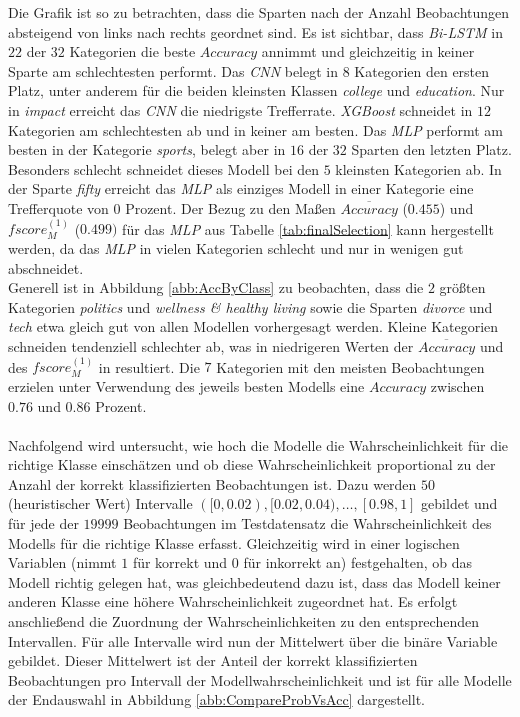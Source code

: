 \documentclass[a4paper,11pt]{article}
\begin{document}
Die Grafik ist so zu betrachten, dass die Sparten nach der Anzahl Beobachtungen absteigend von links nach rechts geordnet sind. Es ist sichtbar, dass \textit{Bi-LSTM} in $22$ der $32$ Kategorien die beste $Accuracy$ annimmt und gleichzeitig in keiner Sparte am schlechtesten performt. Das \textit{CNN} belegt in $8$ Kategorien den ersten Platz, unter anderem für die beiden kleinsten Klassen \textit{college} und \textit{education}. Nur in \textit{impact} erreicht das \textit{CNN} die niedrigste Trefferrate.
\textit{XGBoost} schneidet in $12$ Kategorien am schlechtesten ab und in keiner am besten. Das \textit{MLP} performt am besten in der Kategorie \textit{sports}, belegt aber in $16$ der $32$ Sparten den letzten Platz. Besonders schlecht schneidet dieses Modell bei den $5$ kleinsten Kategorien ab. In der Sparte \textit{fifty} erreicht das \textit{MLP} als einziges Modell in einer Kategorie eine Trefferquote von $0$ Prozent. Der Bezug zu den Maßen $\overline{Accuracy}$ ($0.455$) und $fscore_M^{(1)}$ ($0.499)$ für das \textit{MLP} aus Tabelle \ref{tab:finalSelection} kann hergestellt werden, da das \textit{MLP} in vielen Kategorien schlecht und nur in wenigen gut abschneidet. \\
Generell ist in Abbildung \ref{abb:AccByClass} zu beobachten, dass die $2$ größten Kategorien \textit{politics} und \textit{wellness \& healthy living} sowie die Sparten \textit{divorce} und \textit{tech} etwa gleich gut von allen Modellen vorhergesagt werden. Kleine Kategorien schneiden tendenziell schlechter ab, was in niedrigeren Werten der $\overline{Accuracy}$ und des $fscore_M^{(1)}$ in resultiert. Die $7$ Kategorien mit den meisten Beobachtungen erzielen unter Verwendung des jeweils besten Modells eine $Accuracy$ zwischen $0.76$ und $0.86$ Prozent. \\
\\
Nachfolgend wird untersucht, wie hoch die Modelle die Wahrscheinlichkeit für die richtige Klasse einschätzen und ob diese Wahrscheinlichkeit proportional zu der Anzahl der korrekt klassifizierten Beobachtungen ist. Dazu werden $50$ (heuristischer Wert) Intervalle $([0, 0.02), [0.02, 0.04), \dots, [0.98, 1]$ gebildet und für jede der $19999$ Beobachtungen im Testdatensatz die Wahrscheinlichkeit des Modells für die richtige Klasse erfasst. Gleichzeitig wird in einer logischen Variablen (nimmt $1$ für korrekt und $0$ für inkorrekt an) festgehalten, ob das Modell richtig gelegen hat, was gleichbedeutend dazu ist, dass das Modell keiner anderen Klasse eine höhere Wahrscheinlichkeit zugeordnet hat.
Es erfolgt anschließend die Zuordnung der Wahrscheinlichkeiten zu den entsprechenden Intervallen. Für alle Intervalle wird nun der Mittelwert über die binäre Variable gebildet. Dieser Mittelwert ist der Anteil der korrekt klassifizierten Beobachtungen pro Intervall der Modellwahrscheinlichkeit und ist für alle Modelle der Endauswahl in Abbildung \ref{abb:CompareProbVsAcc} dargestellt.
\end{document}
